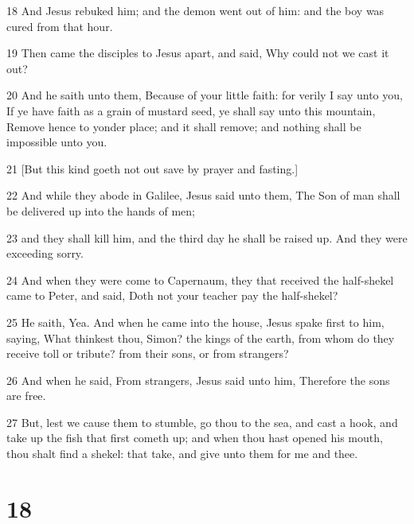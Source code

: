 \par 18 And Jesus rebuked him; and the demon went out of him: and the boy was cured from that hour.
\par 19 Then came the disciples to Jesus apart, and said, Why could not we cast it out?
\par 20 And he saith unto them, Because of your little faith: for verily I say unto you, If ye have faith as a grain of mustard seed, ye shall say unto this mountain, Remove hence to yonder place; and it shall remove; and nothing shall be impossible unto you.
\par 21 [But this kind goeth not out save by prayer and fasting.]
\par 22 And while they abode in Galilee, Jesus said unto them, The Son of man shall be delivered up into the hands of men;
\par 23 and they shall kill him, and the third day he shall be raised up. And they were exceeding sorry.
\par 24 And when they were come to Capernaum, they that received the half-shekel came to Peter, and said, Doth not your teacher pay the half-shekel?
\par 25 He saith, Yea. And when he came into the house, Jesus spake first to him, saying, What thinkest thou, Simon? the kings of the earth, from whom do they receive toll or tribute? from their sons, or from strangers?
\par 26 And when he said, From strangers, Jesus said unto him, Therefore the sons are free.
\par 27 But, lest we cause them to stumble, go thou to the sea, and cast a hook, and take up the fish that first cometh up; and when thou hast opened his mouth, thou shalt find a shekel: that take, and give unto them for me and thee.

\chapter{18}

